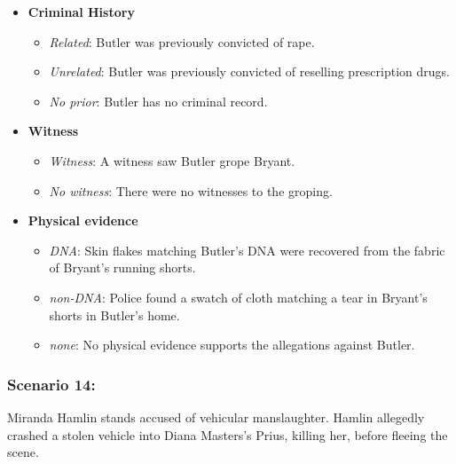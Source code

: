 \documentclass[
]{article}
\providecommand{\tightlist}{%
  \setlength{\itemsep}{0pt}\setlength{\parskip}{0pt}}
\begin{document}
\begin{itemize}
\tightlist
\item
  \textbf{Criminal History}

  \begin{itemize}
  \tightlist
  \item
    \emph{Related}: Butler was previously convicted of rape.
  \item
    \emph{Unrelated}: Butler was previously convicted of reselling
    prescription drugs.
  \item
    \emph{No prior}: Butler has no criminal record.
  \end{itemize}
\item
  \textbf{Witness}

  \begin{itemize}
  \tightlist
  \item
    \emph{Witness}: A witness saw Butler grope Bryant.
  \item
    \emph{No witness}: There were no witnesses to the groping.
  \end{itemize}
\item
  \textbf{Physical evidence}

  \begin{itemize}
  \tightlist
  \item
    \emph{DNA}: Skin flakes matching Butler's DNA were recovered from
    the fabric of Bryant's running shorts.
  \item
    \emph{non-DNA}: Police found a swatch of cloth matching a tear in
    Bryant's shorts in Butler's home.
  \item
    \emph{none}: No physical evidence supports the allegations against
    Butler.
  \end{itemize}
\end{itemize}

\hypertarget{scenario-14}{%
\subsubsection{Scenario 14:}\label{scenario-14}}

Miranda Hamlin stands accused of vehicular manslaughter. Hamlin
allegedly crashed a stolen vehicle into Diana Masters's Prius, killing
her, before fleeing the scene.
\end{document}
